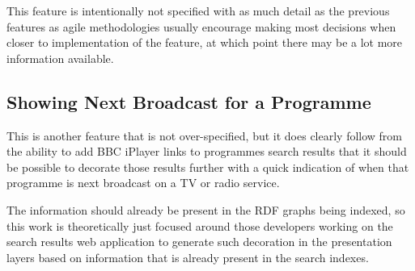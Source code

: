 This feature is intentionally not specified with as much detail
as the previous features as agile methodologies usually encourage
making most decisions when closer to implementation of the feature, at
which point there may be a lot more information available.

\subsection{Showing Next Broadcast for a Programme}

This is another feature that is not over-specified, but it does
clearly follow from the ability to add BBC iPlayer links to
programmes search results that it should be possible to decorate
those results further with a quick indication of when that
programme is next broadcast on a TV or radio service.

The information should already be present in the RDF graphs being indexed,
so this work is theoretically just focused around those developers
working on the search results web application to generate such
decoration in the presentation layers based on information that is
already present in the search indexes.
